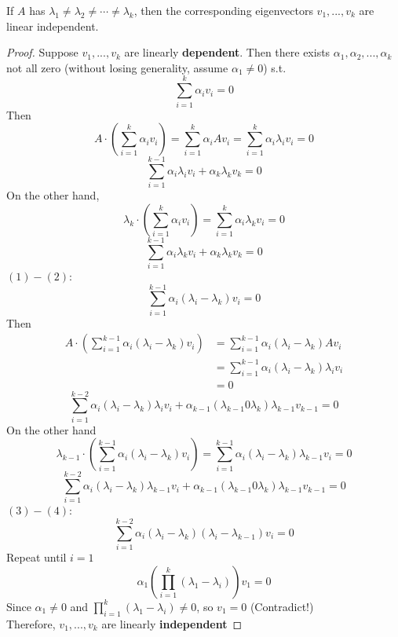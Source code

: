 \begin{multicols}{2}
If $A$ has $\lambda_1\neq\lambda_2\neq\cdots\neq\lambda_k$, then the corresponding eigenvectors $v_1,...,v_k$ are linear independent. \\
\begin{proof}
    \par Suppose $v_1,...,v_k$ are linearly \textbf{dependent}. Then there exists $\alpha_1,\alpha_2,...,\alpha_k$ not all zero 
    (without losing generality, assume $\alpha_1\neq 0$) s.t. 
    \[
        \sum_{i=1}^k \alpha_i v_i = 0
    \]
    Then
    \[
        A\cdot \left(\sum_{i=1}^k \alpha_i v_i\right) = \sum_{i=1}^k \alpha_i A v_i = \sum_{i=1}^k \alpha_i \lambda_i v_i = 0
    \]
    \begin{equation}
        \sum_{i=1}^{k-1} \alpha_i \lambda_i v_i + \alpha_k \lambda_k v_k = 0 \tag{1}
    \end{equation}
    On the other hand,
    \[
        \lambda_k\cdot \left(\sum_{i=1}^k \alpha_i v_i\right) = \sum_{i=1}^{k} \alpha_i \lambda_k v_i = 0
    \]
    \begin{equation}
        \sum_{i=1}^{k-1} \alpha_i \lambda_k v_i + \alpha_k \lambda_k v_k = 0 \tag{2}
    \end{equation}
    $(1)-(2)$:
    \[
        \sum_{i=1}^{k-1} \alpha_i (\lambda_i - \lambda_k) v_i = 0
    \]
    Then
    \[
        \begin{array}{rl}
            A\cdot \left(\sum_{i=1}^{k-1} \alpha_i (\lambda_i - \lambda_k) v_i\right)&=\sum_{i=1}^{k-1} \alpha_i (\lambda_i - \lambda_k) Av_i \\
            &=\sum_{i=1}^{k-1} \alpha_i (\lambda_i - \lambda_k) \lambda_i v_i \\
            & = 0
        \end{array}
    \]
    \begin{equation}
        \sum_{i=1}^{k-2} \alpha_i (\lambda_i - \lambda_k) \lambda_i v_i + \alpha_{k-1}(\lambda_{k-1}0\lambda_k)\lambda_{k-1}v_{k-1}=0 \tag{3}
    \end{equation}
    On the other hand
    \[
        \lambda_{k-1}\cdot \left(\sum_{i=1}^{k-1} \alpha_i (\lambda_i - \lambda_k) v_i\right)=\sum_{i=1}^{k-1} \alpha_i (\lambda_i - \lambda_k)\lambda_{k-1}v_i =0 
    \]
    \begin{equation}
        \sum_{i=1}^{k-2} \alpha_i (\lambda_i - \lambda_k) \lambda_{k-1} v_i + \alpha_{k-1}(\lambda_{k-1}0\lambda_k)\lambda_{k-1}v_{k-1}=0 \tag{4}
    \end{equation}
    $(3)-(4)$:
    \[
        \sum_{i=1}^{k-2} \alpha_i (\lambda_i - \lambda_k)(\lambda_i - \lambda_{k-1}) v_i = 0
    \]
    Repeat until $i=1$ 
    \[
        \alpha_1\left(\prod_{i=1}^k(\lambda_1 - \lambda_i)\right)v_1 = 0
    \]
    Since $\alpha_1\neq 0$ and $\prod_{i=1}^k(\lambda_1 - \lambda_i)\neq 0$, so $v_1 = 0$ (Contradict!) \\
    Therefore, $v_1,...,v_k$ are linearly \textbf{independent}
\end{proof}


\end{multicols}
